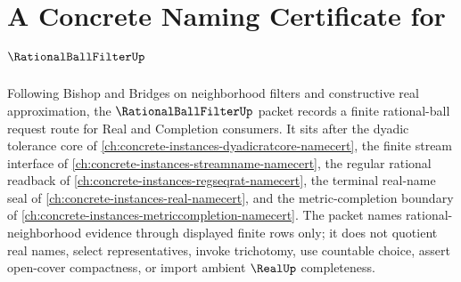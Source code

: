 \chapter{A Concrete Naming Certificate for $\RationalBallFilterUp$}
\label{ch:concrete-instances-rational-ball-filter-namecert}

Following Bishop and Bridges on neighborhood filters and constructive real approximation, the $\RationalBallFilterUp$ packet records a finite rational-ball request route for Real and Completion consumers. It sits after the dyadic tolerance core of \autoref{ch:concrete-instances-dyadicratcore-namecert}, the finite stream interface of \autoref{ch:concrete-instances-streamname-namecert}, the regular rational readback of \autoref{ch:concrete-instances-regseqrat-namecert}, the terminal real-name seal of \autoref{ch:concrete-instances-real-namecert}, and the metric-completion boundary of \autoref{ch:concrete-instances-metriccompletion-namecert}. The packet names rational-neighborhood evidence through displayed finite rows only; it does not quotient real names, select representatives, invoke trichotomy, use countable choice, assert open-cover compactness, or import ambient $\RealUp$ completeness.

